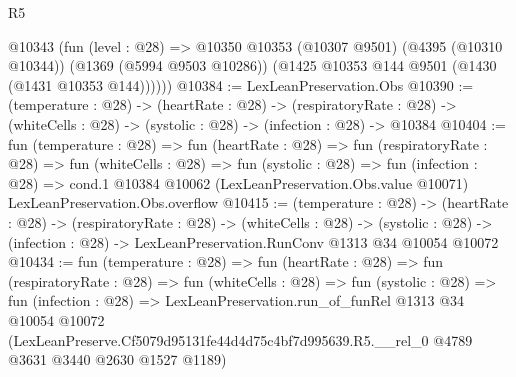 \begin{lexlean}{R5}
\begin{coremodule}
      @10343
        (fun (level : @28) =>
        @10350
          @10353
          (@10307 @9501)
          (@4395 (@10310 @10344))
          (@1369 (@5994 @9503 @10286))
          (@1425 @10353 @144 @9501 (@1430 (@1431 @10353 @144))))))
@10384 := LexLeanPreservation.Obs
@10390 := (temperature : @28) ->
  (heartRate : @28) ->
  (respiratoryRate : @28) -> (whiteCells : @28) -> (systolic : @28) -> (infection : @28) -> @10384
@10404 := fun (temperature : @28) =>
  fun (heartRate : @28) =>
  fun (respiratoryRate : @28) =>
  fun (whiteCells : @28) =>
  fun (systolic : @28) =>
  fun (infection : @28) =>
  cond.{1} @10384 @10062 (LexLeanPreservation.Obs.value @10071) LexLeanPreservation.Obs.overflow
@10415 := (temperature : @28) ->
  (heartRate : @28) ->
  (respiratoryRate : @28) ->
  (whiteCells : @28) ->
  (systolic : @28) -> (infection : @28) -> LexLeanPreservation.RunConv @1313 @34 @10054 @10072
@10434 := fun (temperature : @28) =>
  fun (heartRate : @28) =>
  fun (respiratoryRate : @28) =>
  fun (whiteCells : @28) =>
  fun (systolic : @28) =>
  fun (infection : @28) =>
  LexLeanPreservation.run_of_funRel
    @1313
    @34
    @10054
    @10072
    (LexLeanPreserve.Cf5079d95131fe44d4d75c4bf7d995639.R5.__rel_0
      @4789
      @3631
      @3440
      @2630
      @1527
      @1189)
\end{coremodule}
\end{lexlean}
